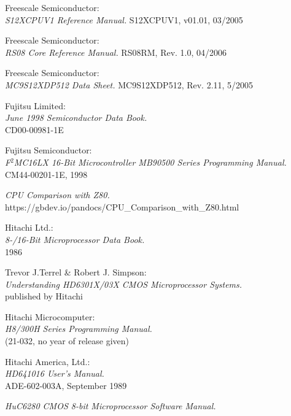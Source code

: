  Freescale Semiconductor: \\
                  {\em S12XCPUV1 Reference Manual.\/}
                  S12XCPUV1, v01.01, 03/2005

 Freescale Semiconductor: \\
                  {\em RS08 Core Reference Manual.\/}
                  RS08RM, Rev. 1.0, 04/2006     

 Freescale Semiconductor: \\
                    {\em MC9S12XDP512 Data Sheet.\/}
                    MC9S12XDP512, Rev. 2.11, 5/2005

 Fujitsu Limited: \\
                    {\em June 1998 Semiconductor Data Book.\/} \\
                    CD00-00981-1E

 Fujitsu Semiconductor: \\
                    {\em F$^2$MC16LX 16-Bit Microcontroller MB90500 Series
                         Programming Manual.\/} \\
                    CM44-00201-1E, 1998

 {\em CPU Comparison with Z80.\/} \\
                https://gbdev.io/pandocs/CPU\_Comparison\_with\_Z80.html

 Hitachi Ltd.: \\
                 {\em 8-/16-Bit Microprocessor Data Book.\/} \\
                 1986

 Trevor J.Terrel \& Robert J. Simpson: \\
                {\em Understanding HD6301X/03X CMOS Microprocessor
                 Systems.\/} \\
		published by Hitachi

 Hitachi Microcomputer: \\
                {\em H8/300H Series Programming Manual.\/} \\
                (21-032, no year of release given)

 Hitachi America, Ltd.: \\
                {\em HD641016 User's Manual.\/} \\
                ADE-602-003A, September 1989

 {\em HuC6280 CMOS 8-bit Microprocessor Software Manual.\/}

